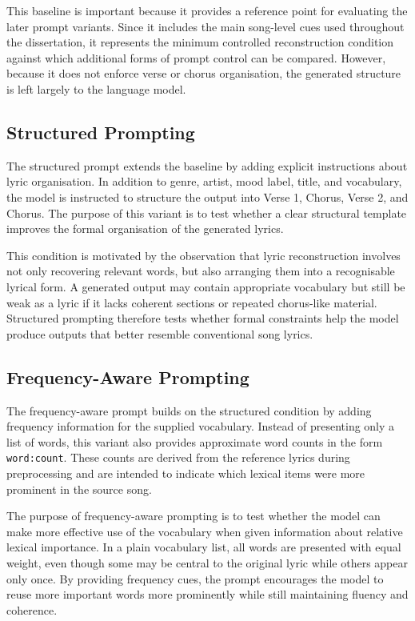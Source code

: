This baseline is important because it provides a reference point for evaluating the later prompt variants. Since it includes the main song-level cues used throughout the dissertation, it represents the minimum controlled reconstruction condition against which additional forms of prompt control can be compared. However, because it does not enforce verse or chorus organisation, the generated structure is left largely to the language model.

\subsection{Structured Prompting}

The structured prompt extends the baseline by adding explicit instructions about lyric organisation. In addition to genre, artist, mood label, title, and vocabulary, the model is instructed to structure the output into Verse 1, Chorus, Verse 2, and Chorus. The purpose of this variant is to test whether a clear structural template improves the formal organisation of the generated lyrics.

This condition is motivated by the observation that lyric reconstruction involves not only recovering relevant words, but also arranging them into a recognisable lyrical form. A generated output may contain appropriate vocabulary but still be weak as a lyric if it lacks coherent sections or repeated chorus-like material. Structured prompting therefore tests whether formal constraints help the model produce outputs that better resemble conventional song lyrics.

\subsection{Frequency-Aware Prompting}

The frequency-aware prompt builds on the structured condition by adding frequency information for the supplied vocabulary. Instead of presenting only a list of words, this variant also provides approximate word counts in the form \texttt{word:count}. These counts are derived from the reference lyrics during preprocessing and are intended to indicate which lexical items were more prominent in the source song.

The purpose of frequency-aware prompting is to test whether the model can make more effective use of the vocabulary when given information about relative lexical importance. In a plain vocabulary list, all words are presented with equal weight, even though some may be central to the original lyric while others appear only once. By providing frequency cues, the prompt encourages the model to reuse more important words more prominently while still maintaining fluency and coherence.

